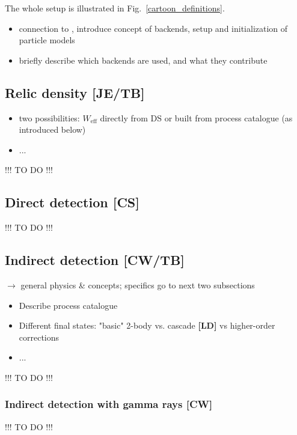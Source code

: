 The whole setup is illustrated in Fig.~\ref{cartoon_definitions}.

\begin{itemize}
  \item connection to \GB, introduce concept of backends, setup and
    initialization of particle models
  \item briefly describe which backends are used, and what they contribute 
\end{itemize}

\subsection{Relic density {\bf [JE/TB]}}
\label{code_rd}
\begin{itemize}
  \item two possibilities: $W_\mathrm{eff}$ directly from DS or built from
    process catalogue (as introduced below)
  \item...
\end{itemize}
\smallskip
{\color{red} !!! TO DO !!!}
\smallskip


\subsection{Direct detection {\bf [CS]}}
\label{code_dd}
\smallskip
{\color{red} !!! TO DO !!!}
\smallskip



\subsection{Indirect detection {\bf [CW/TB]}}
\label{code_id}

$\to$ general physics \& concepts; specifics go to next two subsections
\begin{itemize}
\item Describe process catalogue 
\item Different final states: "basic" 2-body vs. cascade {\bf [LD]} vs higher-order corrections
\item...
\end{itemize}
\smallskip
{\color{red} !!! TO DO !!!}
\smallskip


\subsubsection{Indirect detection with gamma rays {\bf [CW]}}
\label{code_ga}
\smallskip
{\color{red} !!! TO DO !!!}
\smallskip



